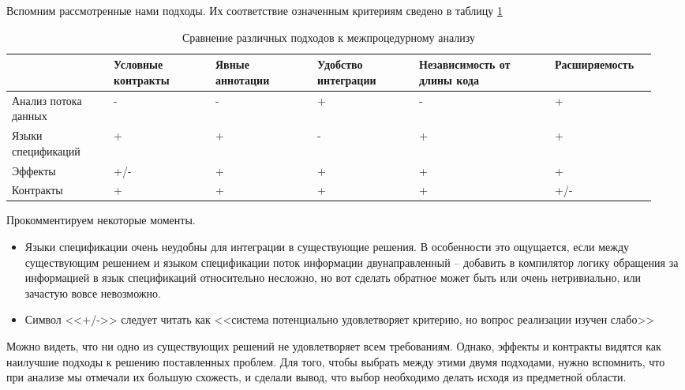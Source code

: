 Вспомним рассмотренные нами подходы. Их соответствие означенным критериям сведено в таблицу \ref{approaches-analysis}

\begin{table}
\begin{tabular}{ | p{0.15\linewidth} | p{0.15\linewidth} | p{0.15\linewidth} | p{0.15\linewidth} | p{0.20\linewidth} | p{0.15\linewidth} | }
  \hline
               & Условные контракты & Явные аннотации            & Удобство интеграции & Независимость от длины кода & Расширяемость \\\hline

  Анализ потока данных &   -          & -               & +           & -               & +          \\\hline

  Языки спецификаций   & +          & +               & -           & +               & +         \\\hline

  Эффекты           & +/-           & +               & +           & +               & +          \\\hline

  Контракты         & +           & +               & +           & +               & +/-         \\\hline
\end{tabular}
\label{approaches-analysis}
\caption{Сравнение различных подходов к межпроцедурному анализу}
\end{table}

Прокомментируем некоторые моменты.

\begin{itemize}
  \item Языки спецификации очень неудобны для интеграции в существующие решения. В особенности это ощущается, если между существующим решением и языком спецификации поток информации двунаправленный -- добавить в компилятор логику обращения за информацией в язык спецификаций относительно несложно, но вот сделать обратное может быть или очень нетривиально, или зачастую вовсе невозможно.

  \item Символ <<+/->> следует читать как <<система потенциально удовлетворяет критерию, но вопрос реализации изучен слабо>>
\end{itemize}

Можно видеть, что ни одно из существующих решений не удовлетворяет всем требованиям. Однако, эффекты и контракты видятся как наилучшие подходы к решению поставленных проблем. Для того, чтобы выбрать между этими двумя подходами, нужно вспомнить, что при анализе мы отмечали их большую схожесть, и сделали вывод, что выбор необходимо делать исходя из предметной области.


